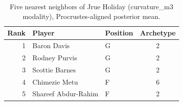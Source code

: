 \begin{table}[htbp]
  \centering\small
  \begin{tabular}{rllc}
    \toprule
    Rank & Player & Position & Archetype \\
    \midrule
    1 & Baron Davis & G & 2 \\
    2 & Rodney Purvis & G & 2 \\
    3 & Scottie Barnes & G & 2 \\
    4 & Chimezie Metu & F & 6 \\
    5 & Shareef Abdur-Rahim & F & 2 \\
    \bottomrule
  \end{tabular}
  \caption{Five nearest neighbors of Jrue Holiday (curvature_m3 modality), Procrustes-aligned posterior mean.}
  \label{tab:Jrue_Holiday_neighbors_curvature_m3}
\end{table}

